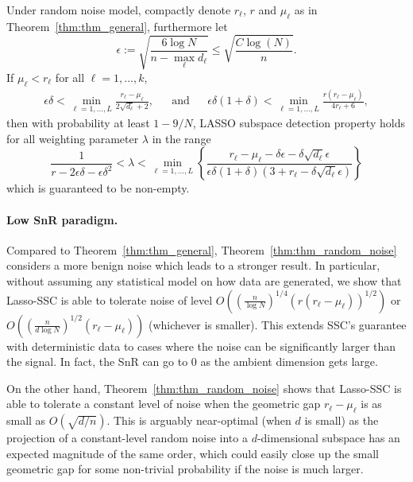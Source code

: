 \documentclass[12pt,heading]{ctexbook}
\begin{document}
\begin{theorem}\label{thm:thm_random_noise}
 Under random noise model, compactly denote $r_{\ell}$, $r$ and $\mu_{\ell}$ as in Theorem~\ref{thm:thm_general}, furthermore let
$$\epsilon := \sqrt{\frac{6\log N}{n-\max_{\ell}{d_{\ell}}}}\leq \sqrt{\frac{C\log(N)}{n}}.$$
 If $\mu_{\ell}<r_{\ell}$ for all $\ell = 1,...,k$,
 \begin{align*}
 \epsilon\delta<\min_{\ell=1,...,L}\frac{r_{\ell}-\mu_{\ell}}{2\sqrt{d_{\ell}}+2}, &&\text{and}&& \epsilon\delta(1+\delta) < \min_{\ell=1,...,L}\frac{r(r_\ell-\mu_\ell)}{4r_\ell+6},
\end{align*}
then with probability at least $1-9/N$, LASSO subspace detection property holds for all weighting parameter $\lambda$ in the range
\begin{equation}\label{eq:thm_rand_noise_lambda_range}
\frac{1}{r- 2\epsilon \delta-\epsilon\delta^2}<
        \lambda<\min_{\ell=1,...,L}\left\{\frac{r_{\ell}-\mu_{\ell}-\delta\epsilon - \delta \sqrt{d_{\ell}} \epsilon}{\epsilon\delta(1+\delta)(3+r_{\ell}-\delta\sqrt{d_{\ell}}\epsilon)}\right\}
\end{equation}
which is guaranteed to be non-empty.
\end{theorem}
\paragraph{Low SnR paradigm.} Compared to Theorem~\ref{thm:thm_general}, Theorem~\ref{thm:thm_random_noise} considers a more benign noise which leads to a stronger result. In particular, without assuming any statistical model on how data are generated, we show that Lasso-SSC is able to tolerate noise of level $O\left((\frac{n}{\log N})^{1/4}(r(r_\ell-\mu_\ell))^{1/2}\right)$ or $O\left((\frac{n}{d\log N})^{1/2}(r_\ell-\mu_\ell)\right)$ (whichever is smaller). This extends SSC's guarantee with deterministic data to cases where the noise can be significantly larger than the signal. In fact, the SnR can go to $0$ as the ambient dimension gets large.

On the other hand, Theorem~\ref{thm:thm_random_noise} shows that Lasso-SSC is able to tolerate a constant level of noise when the geometric gap $r_\ell-\mu_\ell$ is as small as $O(\sqrt{d/n})$. This is arguably near-optimal (when $d$ is small) as the projection of a constant-level random noise into a $d$-dimensional subspace has an expected magnitude of the same order, which could easily close up the small geometric gap for some non-trivial probability if the noise is much larger.
\end{document}
